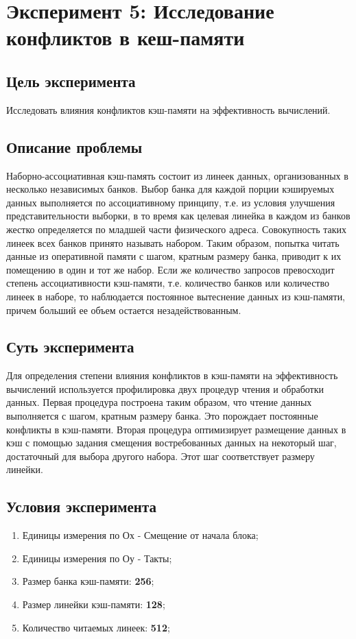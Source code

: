 \chapter{Эксперимент 5: Исследование конфликтов в кеш-памяти}

\section{Цель эксперимента}
Исследовать влияния конфликтов кэш-памяти на эффективность вычислений.

\section{Описание проблемы}
Наборно-ассоциативная кэш-память состоит из линеек данных, организованных в несколько независимых банков. Выбор банка для каждой порции кэшируемых данных выполняется по ассоциативному принципу, т.е. из условия улучшения представительности выборки, в то время как целевая линейка в каждом из банков жестко определяется по младшей части физического адреса. Совокупность таких линеек всех банков принято называть набором. Таким образом, попытка читать данные из оперативной памяти с шагом, кратным размеру банка, приводит к их помещению в один и тот же набор. Если же количество запросов превосходит степень ассоциативности кэш-памяти, т.е. количество банков или количество линеек в наборе, то наблюдается постоянное вытеснение данных из кэш-памяти, причем  больший ее объем  остается незадействованным.  

\section{Суть эксперимента}
Для определения степени влияния конфликтов в кэш-памяти на эффективность вычислений используется профилировка двух процедур чтения и обработки данных. Первая процедура построена таким образом, что чтение данных выполняется с шагом, кратным размеру банка. Это порождает постоянные конфликты в кэш-памяти. Вторая процедура оптимизирует размещение данных в кэш с помощью задания смещения востребованных данных на некоторый шаг, достаточный для выбора другого набора. Этот шаг соответствует размеру линейки. 

\section{Условия эксперимента}
\begin{enumerate}
    \item Единицы измерения по Ох - Смещение от начала блока;
    \item Единицы измерения по Оу - Такты;
    \item Размер банка кэш-памяти: \textbf{256};
    \item Размер линейки кэш-памяти: \textbf{128};
    \item Количество читаемых линеек: \textbf{512};
\end{enumerate}

